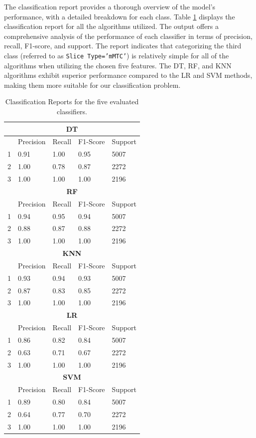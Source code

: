 \documentclass[conference]{IEEEtran}
\begin{document}
The classification report provides a thorough overview of the model's performance, with a detailed breakdown for each class. Table \ref{tab:classification_reports} displays the classification report for all the algorithms utilized. The output offers a comprehensive analysis of the performance of each classifier in terms of precision, recall, F1-score, and support. The report indicates that categorizing the third class (referred to as \texttt{\footnotesize Slice Type='mMTC'}) is relatively simple for all of the algorithms when utilizing the chosen five features. The DT, RF, and KNN algorithms exhibit superior performance compared to the LR and SVM methods, making them more suitable for our classification problem.

\begin{table}[h]
\vspace{-3mm}
\centering
\caption{Classification Reports for the five evaluated classifiers.}
\label{tab:classification_reports}
\begin{tabular}{|l|l|l|l|l|}
\hline
\multicolumn{5}{|c|}{\textbf{DT}} \\ \hline
& Precision & Recall & F1-Score & Support \\ \hline
1 & 0.91 & 1.00 & 0.95 & 5007 \\ \hline
2 & 1.00 & 0.78 & 0.87 & 2272 \\ \hline
3 & 1.00 & 1.00 & 1.00 & 2196 \\ \hline \hline
\multicolumn{5}{|c|}{\textbf{RF}} \\ \hline
& Precision & Recall & F1-Score & Support \\ \hline
1 & 0.94 & 0.95 & 0.94 & 5007 \\ \hline
2 & 0.88 & 0.87 & 0.88 & 2272 \\ \hline
3 & 1.00 & 1.00 & 1.00 & 2196 \\ \hline \hline
\multicolumn{5}{|c|}{\textbf{KNN}} \\ \hline
& Precision & Recall & F1-Score & Support \\ \hline
1 & 0.93 & 0.94 & 0.93 & 5007 \\ \hline
2 & 0.87 & 0.83 & 0.85 & 2272 \\ \hline
3 & 1.00 & 1.00 & 1.00 & 2196 \\ \hline \hline
\multicolumn{5}{|c|}{\textbf{LR}} \\ \hline
& Precision & Recall & F1-Score & Support \\ \hline
1 & 0.86 & 0.82 & 0.84 & 5007 \\ \hline
2 & 0.63 & 0.71 & 0.67 & 2272 \\ \hline
3 & 1.00 & 1.00 & 1.00 & 2196 \\ \hline \hline
\multicolumn{5}{|c|}{\textbf{SVM}} \\ \hline
& Precision & Recall & F1-Score & Support \\ \hline
1 & 0.89 & 0.80 & 0.84 & 5007 \\ \hline
2 & 0.64 & 0.77 & 0.70 & 2272 \\ \hline
3 & 1.00 & 1.00 & 1.00 & 2196 \\ \hline
\end{tabular}
\vspace{-5mm}
\end{table}
\end{document}
